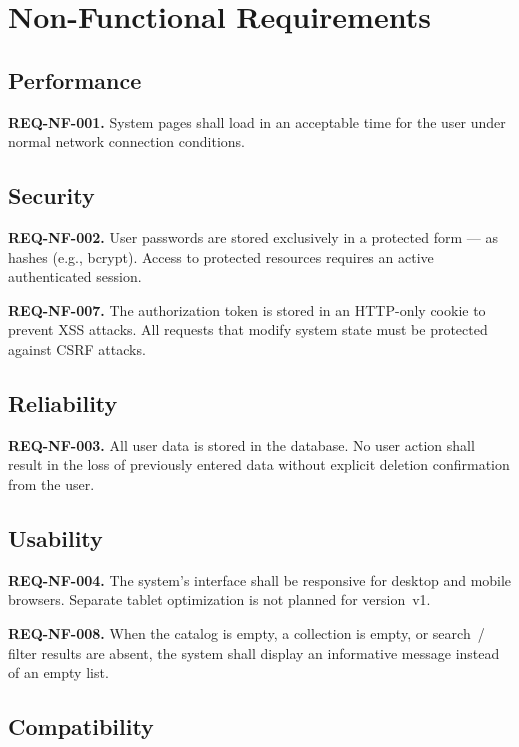 \section{Non-Functional Requirements}
\label{sec:nefunktsionalni-vymohy}

\subsection{Performance}

\textbf{REQ-NF-001.} System pages shall load in an acceptable time for the user under normal network connection conditions. 

\subsection{Security}

\textbf{REQ-NF-002.} User passwords are stored exclusively in a protected form --- as hashes (e.g., bcrypt). Access to protected resources requires an active authenticated session. 

\textbf{REQ-NF-007.} The authorization token is stored in an HTTP-only cookie to prevent XSS attacks. All requests that modify system state must be protected against CSRF attacks. 

\subsection{Reliability}

\textbf{REQ-NF-003.} All user data is stored in the database. No user action shall result in the loss of previously entered data without explicit deletion confirmation from the user. 

\subsection{Usability}

\textbf{REQ-NF-004.} The system's interface shall be responsive for desktop and mobile browsers. Separate tablet optimization is not planned for version~v1. 

\textbf{REQ-NF-008.} When the catalog is empty, a collection is empty, or search~/ filter results are absent, the system shall display an informative message instead of an empty list. 

\subsection{Compatibility}

